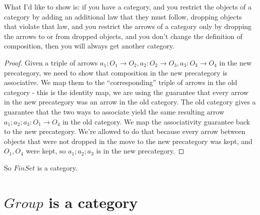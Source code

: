 \documentclass{proc-l}
\theoremstyle{definition}
\theoremstyle{remark}
\numberwithin{equation}{section}
\begin{document}
What I'd like to show is: if you have a category, and you restrict the objects of a category by adding an additional law that they must follow, dropping objects that violate that law, and you restrict the arrows of a category only by dropping the arrows to or from dropped objects, and you don't change the definition of composition, then you will always get another category.


\begin{proof}
Given a triple of arrows $a_1: O_1 \rightarrow O_2, a_2: O_2 \rightarrow O_3, a_3 : O_3 \rightarrow O_4$ in the new precategory, we need to show that composition in the new precategory is associative.
We map them to the ``corresponding'' triple of arrows in the old category - this is the identity map,
 we are using the guarantee that every arrow in the new precategory was an arrow in the old category. The old category gives a guarantee that the two ways to associate yield the same resulting arrow $a_1 ; a_2 ; a_3 : O_1 \rightarrow O_4$ in the old category. We map the associativity guarantee back to the new precategory. We're allowed to do that because every arrow between objects that were not dropped in the move to the new precategory was kept, and $O_1, O_4$ were kept, so $a_1 ; a_2 ; a_3$ is in the new precategory.
\end{proof}

So $FinSet$ is a category.

\section{$Group$ is a category}
\end{document}
